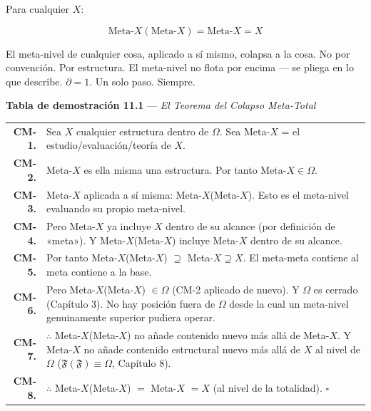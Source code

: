 \documentclass[10pt, openany, oneside]{book}
\renewcommand{\footnotesize}{\fontsize{8.5}{11}\selectfont}
\begin{document}
\vspace{2em}


\noindent Para cualquier $X$:

$$\text{Meta-}X(\text{Meta-}X) = \text{Meta-}X = X$$

El meta-nivel de cualquier cosa, aplicado a sí mismo, colapsa a la cosa. No por convención. Por estructura. El meta-nivel no flota por encima --- se pliega en lo que describe. $\partial = 1$. Un solo paso. Siempre.

\vspace{0.5em}

\textbf{Tabla de demostración 11.1} --- \textit{El Teorema del Colapso Meta-Total}

\vspace{0.5em}

{\footnotesize
\noindent\begin{tabular}{r p{}}
\textbf{CM-1.} & Sea $X$ cualquier estructura dentro de $\Omega$. Sea Meta-$X$ = el estudio/evaluación/teoría de $X$. \\[0.3em]
\textbf{CM-2.} & Meta-$X$ es ella misma una estructura. Por tanto Meta-$X \in \Omega$. \\[0.3em]
\textbf{CM-3.} & Meta-$X$ aplicada a sí misma: Meta-$X$(Meta-$X$). Esto es el meta-nivel evaluando su propio meta-nivel. \\[0.3em]
\textbf{CM-4.} & Pero Meta-$X$ ya incluye $X$ dentro de su alcance (por definición de «meta»). Y Meta-$X$(Meta-$X$) incluye Meta-$X$ dentro de su alcance. \\[0.3em]
\textbf{CM-5.} & Por tanto Meta-$X$(Meta-$X$) $\supseteq$ Meta-$X \supseteq X$. El meta-meta contiene al meta contiene a la base. \\[0.3em]
\textbf{CM-6.} & Pero Meta-$X$(Meta-$X$) $\in \Omega$ (CM-2 aplicado de nuevo). Y $\Omega$ es cerrado (Capítulo 3). No hay posición fuera de $\Omega$ desde la cual un meta-nivel genuinamente superior pudiera operar. \\[0.3em]
\textbf{CM-7.} & $\therefore$ Meta-$X$(Meta-$X$) no añade contenido nuevo más allá de Meta-$X$. Y Meta-$X$ no añade contenido estructural nuevo más allá de $X$ al nivel de $\Omega$ ($\mathfrak{F}(\mathfrak{F}) \equiv \Omega$, Capítulo 8). \\[0.3em]
\textbf{CM-8.} & $\therefore$ Meta-$X$(Meta-$X$) $=$ Meta-$X$ $= X$ (al nivel de la totalidad). $\square$ \\[0.3em]
\end{tabular}
}
\end{document}

